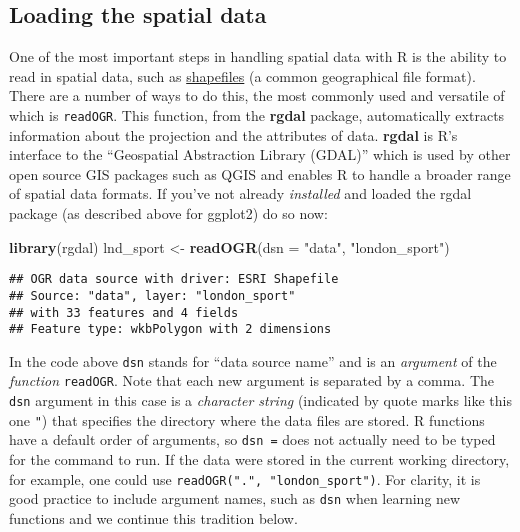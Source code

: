 \documentclass[]{article}
\newenvironment{Shaded}{}{}
\newcommand{\KeywordTok}[1]{\textcolor[rgb]{0.00,0.44,0.13}{\textbf{{#1}}}}
\newcommand{\DataTypeTok}[1]{\textcolor[rgb]{0.56,0.13,0.00}{{#1}}}
\newcommand{\StringTok}[1]{\textcolor[rgb]{0.25,0.44,0.63}{{#1}}}
\newcommand{\NormalTok}[1]{{#1}}
\begin{document}
\subsection{Loading the spatial data}\label{loading-the-spatial-data}

One of the most important steps in handling spatial data with R is the
ability to read in spatial data, such as
\href{http://en.wikipedia.org/wiki/Shapefile}{shapefiles} (a common
geographical file format). There are a number of ways to do this, the
most commonly used and versatile of which is \texttt{readOGR}. This
function, from the \textbf{rgdal} package, automatically extracts
information about the projection and the attributes of data.
\textbf{rgdal} is R's interface to the ``Geospatial Abstraction Library
(GDAL)'' which is used by other open source GIS packages such as QGIS
and enables R to handle a broader range of spatial data formats. If
you've not already \emph{installed} and loaded the rgdal package (as
described above for ggplot2) do so now:

\begin{Shaded}
\begin{Highlighting}[]
\KeywordTok{library}\NormalTok{(rgdal)}
\NormalTok{lnd_sport <-}\StringTok{ }\KeywordTok{readOGR}\NormalTok{(}\DataTypeTok{dsn =} \StringTok{"data"}\NormalTok{, }\StringTok{"london_sport"}\NormalTok{)}
\end{Highlighting}
\end{Shaded}

\begin{verbatim}
## OGR data source with driver: ESRI Shapefile 
## Source: "data", layer: "london_sport"
## with 33 features and 4 fields
## Feature type: wkbPolygon with 2 dimensions
\end{verbatim}

In the code above \texttt{dsn} stands for ``data source name'' and is an
\emph{argument} of the \emph{function} \texttt{readOGR}. Note that each
new argument is separated by a comma. The \texttt{dsn} argument in this
case is a \emph{character string} (indicated by quote marks like this
one \texttt{"}) that specifies the directory where the data files are
stored. R functions have a default order of arguments, so \texttt{dsn =}
does not actually need to be typed for the command to run. If the data
were stored in the current working directory, for example, one could use
\texttt{readOGR(".", "london\_sport")}. For clarity, it is good practice
to include argument names, such as \texttt{dsn} when learning new
functions and we continue this tradition below.
\end{document}
